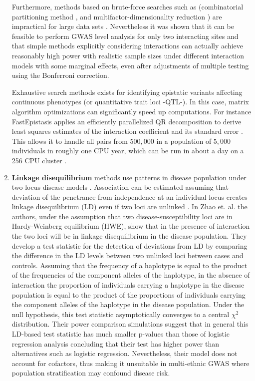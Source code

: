 \begin{enumerate}
Furthermore, methods based on brute-force searches such as (combinatorial partitioning method \cite{nelson2001combinatorial}, and multifactor-dimensionality reduction \cite{ritchie2001multifactor}) are impractical for large data sets \cite{zhang2007bayesian}.
Nevertheless it was shown \cite{li2011detecting} that it can be feasible to perform GWAS level analysis for only two interacting sites and that simple methods explicitly considering interactions can actually achieve reasonably high power with realistic sample sizes under different interaction models with some marginal effects, even after adjustments of multiple testing using the Bonferroni correction.
	
Exhaustive search methods exists for identifying epistatic variants affecting continuous phenotypes (or quantitative trait loci -QTL-).
In this case, matrix algorithm optimizations can significantly speed up computations.
For instance FastEpistasis applies an efficiently parallelized QR decomposition to derive least squares estimates of the interaction coefficient and its standard error \cite{schupbach2010fastepistasis}.
This allows it to handle all pairs from $500,000$ in a population of $5,000$ individuals in roughly one CPU year, which can be run in about a day on a 256 CPU cluster \cite{schupbach2010fastepistasis}.

	\item \textbf{Linkage disequilibrium} methods use patterns in disease population under two-locus disease models \cite{zhao2006test}.
	Association can be estimated assuming that deviation of the penetrance from independence at an individual locus creates linkage disequilibrium (LD) even if two loci are unlinked \cite{zhao2006test}.
In Zhao et. al. \cite{zhao2006test} the authors, under the assumption that two disease-susceptibility loci are in Hardy-Weinberg equilibrium (HWE), show that in the presence of interaction the two loci will be in linkage disequilibrium in the disease population.
They develop a test statistic for the detection of deviations from LD by comparing the difference in the LD levels between two unlinked loci between cases and controls.
Assuming that the frequency of a haplotype is equal to the product of the frequencies of the component alleles of the haplotype, in the absence of interaction the proportion of individuals carrying a haplotype in the disease population is equal to the product of the proportions of individuals carrying the component alleles of the haplotype in the disease population.
Under the null hypothesis, this test statistic asymptotically converges to a central $\chi^2$ distribution.
Their power comparison simulations suggest that in general this LD-based test statistic has much smaller p-values than those of logistic regression analysis concluding that their test has higher power than alternatives such as logistic regression.
Nevertheless, their model does not account for cofactors, thus making it unsuitable in multi-ethnic GWAS where population stratification may confound disease risk.


\end{enumerate}
